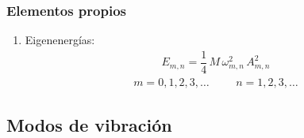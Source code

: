 \documentclass[12pt]{beamer}
\begin{document}
\begin{frame}
\frametitle{Elementos propios}
\begin{enumerate}[<+->]
\conti    
\item Eigenenergías:
\begin{align*}
E_{m,n} = \dfrac{1}{4} \, M \, \omega_{m,n}^{2} \, A_{m,n}^{2}
\end{align*}
\begin{align*}
m = 0, 1, 2, 3, \ldots \hspace{1cm} n = 1, 2, 3, \ldots
\end{align*}
\end{enumerate}
\end{frame}

\subsection{Modos de vibración}
\end{document}
